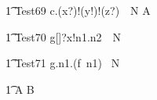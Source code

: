 \begin{circusaction}
   \t1 Test69 \circdef c.(x?)!(y!)!(z?)~\circat~N \then {} \rcirctime A\\
\end{circusaction}

\begin{circusaction}
 \t1 Test70 \circdef g[\nat \cross \nat \cross \nat]?x!n1.n2~\circat~N \then {} \rcirctime \Skip
\end{circusaction}

\begin{circusaction}
   \t1 Test71 \circdef g.n1.(f~n1) \circat~N \then {} \rcirctime \Skip
\end{circusaction}

\begin{circusaction}        
        \t1 \circspot A \circseq B\\
\end{circusaction}

\begin{circus}    
\circend
\end{circus}
